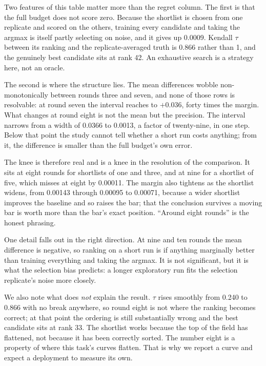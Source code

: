 \documentclass[10pt,conference]{IEEEtran}
\begin{document}
Two features of this table matter more than the regret column. The first is
that the full budget does not score zero. Because the shortlist is chosen from
one replicate and scored on the others, training every candidate and taking the
argmax is itself partly selecting on noise, and it gives up 0.0009. Kendall
$\tau$ between its ranking and the replicate-averaged truth is 0.866 rather
than 1, and the genuinely best candidate sits at rank 42. An exhaustive search
is a strategy here, not an oracle.

The second is where the structure lies. The mean differences wobble
non-monotonically between rounds three and seven, and none of those rows is
resolvable: at round seven the interval reaches to $+0.036$, forty times the
margin. What changes at round eight is not the mean but the precision. The
interval narrows from a width of 0.0366 to 0.0013, a factor of
twenty-nine, in one step. Below that point the study cannot tell whether a
short run costs anything; from it, the difference is smaller than the full
budget's own error.

The knee is therefore real and is a knee in the resolution of the comparison.
It sits at eight rounds for shortlists of one and three, and at nine for a
shortlist of five, which misses at eight by 0.00011. The margin also tightens
as the shortlist widens, from 0.00143 through 0.00095 to 0.00071, because a
wider shortlist improves the baseline and so raises the bar; that the
conclusion survives a moving bar is worth more than the bar's exact position.
``Around eight rounds'' is the honest phrasing.

One detail falls out in the right direction. At nine and ten rounds the mean
difference is negative, so ranking on a short run is if anything marginally
better than training everything and taking the argmax. It is not significant,
but it is what the selection bias predicts: a longer exploratory run fits the
selection replicate's noise more closely.

We also note what does \emph{not} explain the result. $\tau$ rises smoothly
from 0.240 to 0.866 with no break anywhere, so round eight is not where the
ranking becomes correct; at that point the ordering is still substantially
wrong and the best candidate sits at rank 33. The shortlist works because the
top of the field has flattened, not because it has been correctly sorted. The
number eight is a property of where this task's curves flatten. That is why we report a curve and expect a deployment to measure its own.
\end{document}
